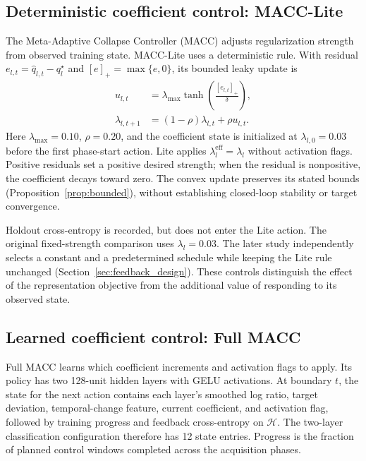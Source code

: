 \documentclass[10pt,a4paper,twocolumn]{article}
\begin{document}
\subsection{Deterministic coefficient control: MACC-Lite}
\label{sec:aligned_lite}

The Meta-Adaptive Collapse Controller (MACC) adjusts regularization
strength from observed training state. MACC-Lite uses a deterministic
rule. With residual $e_{l,t}=\widehat q_{l,t}-q_l^\star$ and
$[e]_+=\max\{e,0\}$, its bounded leaky update is
\begin{align}
 u_{l,t}&=
 \lambda_{\max}\tanh\!\left(\frac{[e_{l,t}]_+}{\delta}\right),\\
 \lambda_{l,t+1}&=(1-\rho)\lambda_{l,t}+\rho u_{l,t}.
 \label{eq:lite}
\end{align}
Here $\lambda_{\max}=0.10$, $\rho=0.20$, and the coefficient state
is initialized at $\lambda_{l,0}=0.03$ before the first phase-start
action. Lite applies $\lambda_l^{\mathrm{eff}}=\lambda_l$ without
activation flags. Positive residuals set a positive desired strength;
when the residual is nonpositive, the coefficient decays toward zero.
The convex update preserves its stated bounds
(Proposition~\ref{prop:bounded}), without establishing
closed-loop stability or target convergence.

Holdout cross-entropy is recorded, but does not enter the Lite action.
The original fixed-strength comparison uses $\lambda_l=0.03$.
The later study independently selects a constant and a predetermined
schedule while keeping the Lite rule unchanged
(Section~\ref{sec:feedback_design}). These controls distinguish the
effect of the representation objective from the additional value of
responding to its observed state.

\subsection{Learned coefficient control: Full MACC}
\label{sec:aligned_full}

Full MACC learns which coefficient increments and activation flags to
apply. Its policy has two 128-unit hidden layers with GELU activations.
At boundary $t$, the state for the next action contains each layer's
smoothed log ratio, target deviation, temporal-change feature, current
coefficient, and activation flag, followed by training progress and
feedback cross-entropy on $\mathcal H$. The two-layer classification
configuration therefore has 12 state entries. Progress is the fraction
of planned control windows completed across the acquisition phases.
\end{document}
